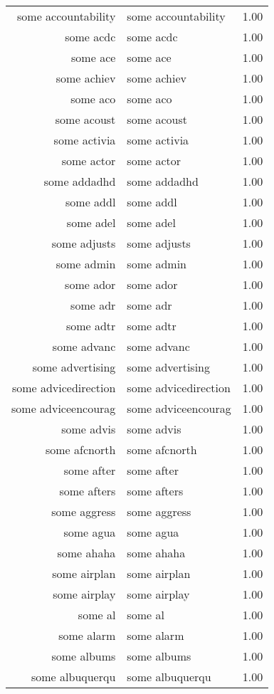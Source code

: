 \begin{table}[ht]
\begin{tabular}{rlr}
  some accountability & some accountability & 1.00 \\ 
  some acdc & some acdc & 1.00 \\ 
  some ace & some ace & 1.00 \\ 
  some achiev & some achiev & 1.00 \\ 
  some aco & some aco & 1.00 \\ 
  some acoust & some acoust & 1.00 \\ 
  some activia & some activia & 1.00 \\ 
  some actor & some actor & 1.00 \\ 
  some addadhd & some addadhd & 1.00 \\ 
  some addl & some addl & 1.00 \\ 
  some adel & some adel & 1.00 \\ 
  some adjusts & some adjusts & 1.00 \\ 
  some admin & some admin & 1.00 \\ 
  some ador & some ador & 1.00 \\ 
  some adr & some adr & 1.00 \\ 
  some adtr & some adtr & 1.00 \\ 
  some advanc & some advanc & 1.00 \\ 
  some advertising & some advertising & 1.00 \\ 
  some advicedirection & some advicedirection & 1.00 \\ 
  some adviceencourag & some adviceencourag & 1.00 \\ 
  some advis & some advis & 1.00 \\ 
  some afcnorth & some afcnorth & 1.00 \\ 
  some after & some after & 1.00 \\ 
  some afters & some afters & 1.00 \\ 
  some aggress & some aggress & 1.00 \\ 
  some agua & some agua & 1.00 \\ 
  some ahaha & some ahaha & 1.00 \\ 
  some airplan & some airplan & 1.00 \\ 
  some airplay & some airplay & 1.00 \\ 
  some al & some al & 1.00 \\ 
  some alarm & some alarm & 1.00 \\ 
  some albums & some albums & 1.00 \\ 
  some albuquerqu & some albuquerqu & 1.00 \\ 

\end{tabular}
\end{table}
